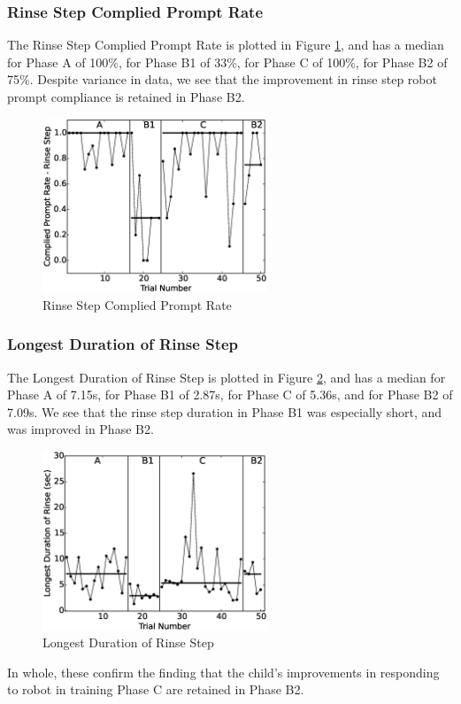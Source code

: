 \documentclass{ut-thesis}
\begin{document}
\subsubsection{Rinse Step Complied Prompt Rate}
The Rinse Step Complied Prompt Rate is plotted in Figure \ref{fig:5CompliedPromptRate-RinseStep}, and has a median for Phase A of 100\%, for Phase B1 of 33\%, for Phase C of 100\%, for Phase B2 of 75\%.  Despite variance in data, we see that the improvement in rinse step robot prompt compliance is retained in Phase B2.
\begin{figure} [H]
	\centering
	\includegraphics[width=0.6\textwidth]{./img/data_analysis/5CompliedPromptRate-RinseStep.eps}
	\caption{Rinse Step Complied Prompt Rate}
	\label{fig:5CompliedPromptRate-RinseStep}
\end{figure}

\subsubsection{Longest Duration of Rinse Step}
The Longest Duration of Rinse Step is plotted in Figure \ref{fig:8LongestDurationofRinsesec}, and has a median for Phase A of 7.15s, for Phase B1 of 2.87s, for Phase C of 5.36s, and for Phase B2 of 7.09s.  We see that the rinse step duration in Phase B1 was especially short, and was improved in Phase B2.
\begin{figure} [H]
	\centering
	\includegraphics[width=0.6\textwidth]{./img/data_analysis/8LongestDurationofRinsesec.eps}
	\caption{Longest Duration of Rinse Step}
	\label{fig:8LongestDurationofRinsesec}
\end{figure}
In whole, these confirm the finding that the child's improvements in responding to robot in training Phase C are retained in Phase B2.
\end{document}

